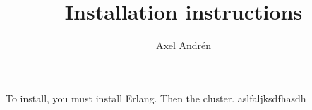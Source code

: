 \title{Installation instructions}
\author{Axel Andr\'en}

\maketitle



To install, you must install Erlang. Then the cluster. aslfaljksdfhasdh


